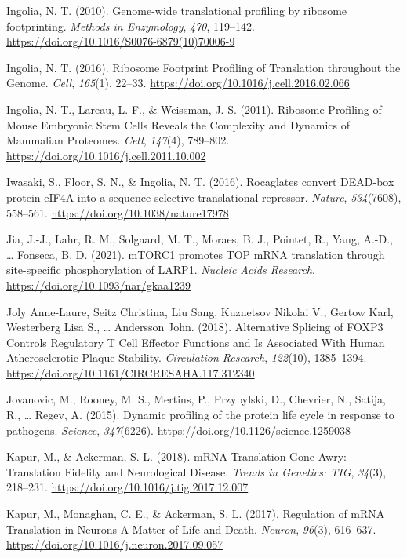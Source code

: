 \documentclass[12pt,openany]{book}
\begin{document}
\hypertarget{ref-Ingolia2010}{}
Ingolia, N. T. (2010). Genome-wide translational profiling by ribosome
footprinting. \emph{Methods in Enzymology}, \emph{470}, 119--142.
\url{https://doi.org/10.1016/S0076-6879(10)70006-9}

\hypertarget{ref-Ingolia2016}{}
Ingolia, N. T. (2016). Ribosome Footprint Profiling of Translation
throughout the Genome. \emph{Cell}, \emph{165}(1), 22--33.
\url{https://doi.org/10.1016/j.cell.2016.02.066}

\hypertarget{ref-Ingolia2011}{}
Ingolia, N. T., Lareau, L. F., \& Weissman, J. S. (2011). Ribosome
Profiling of Mouse Embryonic Stem Cells Reveals the Complexity and
Dynamics of Mammalian Proteomes. \emph{Cell}, \emph{147}(4), 789--802.
\url{https://doi.org/10.1016/j.cell.2011.10.002}

\hypertarget{ref-Iwasaki2016}{}
Iwasaki, S., Floor, S. N., \& Ingolia, N. T. (2016). Rocaglates convert
DEAD-box protein eIF4A into a sequence-selective translational
repressor. \emph{Nature}, \emph{534}(7608), 558--561.
\url{https://doi.org/10.1038/nature17978}

\hypertarget{ref-Jia2021}{}
Jia, J.-J., Lahr, R. M., Solgaard, M. T., Moraes, B. J., Pointet, R.,
Yang, A.-D., \ldots{} Fonseca, B. D. (2021). mTORC1 promotes TOP mRNA
translation through site-specific phosphorylation of LARP1.
\emph{Nucleic Acids Research}.
\url{https://doi.org/10.1093/nar/gkaa1239}

\hypertarget{ref-JolyAnne-Laure2018}{}
Joly Anne-Laure, Seitz Christina, Liu Sang, Kuznetsov Nikolai V., Gertow
Karl, Westerberg Lisa S., \ldots{} Andersson John. (2018). Alternative
Splicing of FOXP3 Controls Regulatory T Cell Effector Functions and Is
Associated With Human Atherosclerotic Plaque Stability.
\emph{Circulation Research}, \emph{122}(10), 1385--1394.
\url{https://doi.org/10.1161/CIRCRESAHA.117.312340}

\hypertarget{ref-Jovanovic2015}{}
Jovanovic, M., Rooney, M. S., Mertins, P., Przybylski, D., Chevrier, N.,
Satija, R., \ldots{} Regev, A. (2015). Dynamic profiling of the protein
life cycle in response to pathogens. \emph{Science}, \emph{347}(6226).
\url{https://doi.org/10.1126/science.1259038}

\hypertarget{ref-Kapur2018}{}
Kapur, M., \& Ackerman, S. L. (2018). mRNA Translation Gone Awry:
Translation Fidelity and Neurological Disease. \emph{Trends in Genetics:
TIG}, \emph{34}(3), 218--231.
\url{https://doi.org/10.1016/j.tig.2017.12.007}

\hypertarget{ref-Kapur2017}{}
Kapur, M., Monaghan, C. E., \& Ackerman, S. L. (2017). Regulation of
mRNA Translation in Neurons-A Matter of Life and Death. \emph{Neuron},
\emph{96}(3), 616--637.
\url{https://doi.org/10.1016/j.neuron.2017.09.057}
\end{document}
